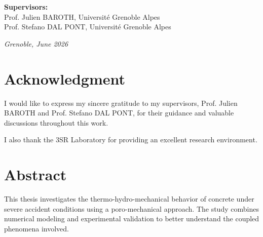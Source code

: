 \documentclass[twoside]{report}
\begin{document}
\begin{titlepage}
\begin{center}
\begin{minipage}[c][0.92\textheight][t]{0.9\textwidth}
        \begin{flushleft}
            {\large \textbf{Supervisors:}} \\
            \vspace{0.5cm}
            {\large Prof. Julien BAROTH, Université Grenoble Alpes} \\
            \vspace{0.3cm}
            {\large Prof. Stefano DAL PONT, Université Grenoble Alpes}
        \end{flushleft}

        \vfill

        {\large \textit{Grenoble, June 2026}}
        \vspace{1cm}
        
    \end{minipage}
\end{center}   
\end{titlepage}



\thispagestyle{empty}
\mbox{}

\cleardoublepage
{}


\chapter*{Acknowledgment}

I would like to express my sincere gratitude to my supervisors,
Prof. Julien BAROTH and Prof. Stefano DAL PONT,
for their guidance and valuable discussions throughout this work.

I also thank the 3SR Laboratory for providing an excellent research environment.



\newpage
\chapter*{Abstract}

This thesis investigates the thermo-hydro-mechanical behavior of concrete
under severe accident conditions using a poro-mechanical approach.
The study combines numerical modeling and experimental validation
to better understand the coupled phenomena involved.
\end{document}
